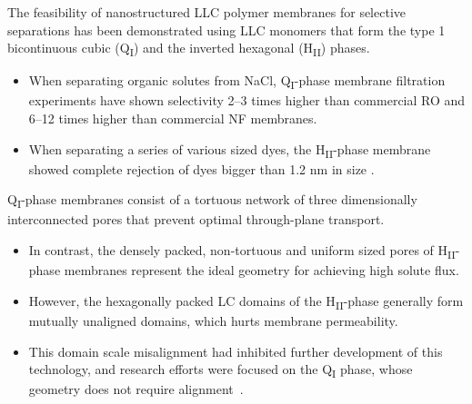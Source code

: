 \documentclass{article}
\begin{document}
  The feasibility of nanostructured LLC polymer membranes for selective separations
  has been demonstrated using LLC monomers that form the type 1 bicontinuous cubic
  (Q\textsubscript{I})\cite{hatakeyama_water_2011,hatakeyama_nanoporous_2010,carter_glycerol-based_2012}
  and the inverted hexagonal (H\textsubscript{II}) \cite{zhou_supported_2005}
  phases. 
  \begin{itemize}
    \item When separating organic solutes from NaCl, Q\textsubscript{I}-phase
    membrane filtration experiments have shown selectivity 2--3 times higher than
    commercial RO and 6--12 times higher than commercial NF membranes.\cite{dischinger_application_2017}
    \item When separating a series of various sized dyes, the 
    H\textsubscript{II}-phase membrane showed complete rejection of dyes bigger
    than 1.2 nm in size \cite{zhou_supported_2005}.
  \end{itemize}

  Q\textsubscript{I}-phase membranes consist of a tortuous network of three
  dimensionally interconnected pores that prevent optimal through-plane
  transport. 
  \begin{itemize}
    \item In contrast, the densely packed, non-tortuous and uniform sized
    pores of H\textsubscript{II}-phase membranes represent the ideal geometry
    for achieving high solute flux\cite{matyka_tortuosity-porosity_2008}.  
    \item However, the hexagonally packed LC domains of the H\textsubscript{II}-phase
    generally form mutually unaligned domains, which hurts membrane permeability. 
    \item This domain scale misalignment had inhibited further development of 
    this technology, and research efforts were focused on the Q\textsubscript{I}
    phase, whose geometry does not require alignment~\cite{zhou_new_2007}.
  \end{itemize}

\end{document}
